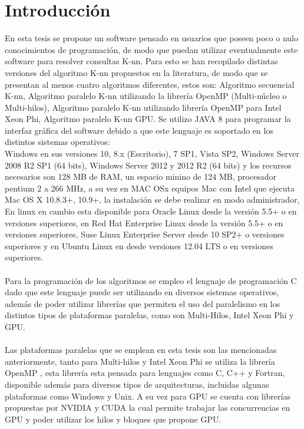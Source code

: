 \chapter[Introducción]{\label{ch:intro}Introducción}

En esta tesis se propone un software pensado en usuarios que poseen poco o nulo conocimientos de programación, de modo que puedan utilizar eventualmente este software para resolver consultas K-nn. Para esto se han recopilado distintas versiones del algoritmo K-nn propuestos en la literatura, de modo que se presentan al menos cuatro algoritmos diferentes, estos son: Algoritmo secuencial K-nn, Algoritmo paralelo K-nn utilizando la librería OpenMP (Multi-núcleo o  Multi-hilos), Algoritmo paralelo K-nn utilizando librería OpenMP para Intel Xeon Phi, Algoritmo paralelo K-nn GPU.
Se utilizo JAVA 8 \cite{java} para programar la interfaz gráfica del software debido a que este lenguaje es soportado en los distintos sistemas operativos:
\\Windows en sus versiones 10, 8.x (Escritorio), 7 SP1, Vista SP2, Windows Server 2008 R2 SP1 (64 bits), Windows Server 2012 y 2012 R2 (64 bits) y los recursos necesarios son 128 MB de RAM, un espacio minino de 124 MB, procesador pentium 2 a 266 MHz, a su vez en MAC OSx equipos Mac con Intel que ejecuta Mac OS X 10.8.3+, 10.9+, la instalación se debe realizar en modo administrador, En linux en cambio esta disponible para Oracle Linux desde la versión 5.5+ o en versiones superiores, en Red Hat Enterprise Linux desde la versión 5.5+ o en versiones superiores, Suse Linux Enterprise Server desde 10 SP2+ o versiones superiores y en Ubuntu Linux en desde versiones 12.04 LTS o en versiones superiores.\\
\\
Para la programación de los algoritmos se empleo el lenguaje de programación C \cite{c} dado que este lenguaje puede ser utilizando en diversos sistemas operativos, además de poder utilizar librerías que permiten el uso del paralelismo en los distintos tipos de plataformas paralelas, como son Multi-Hilos, Intel Xeon Phi y GPU.\\
\\
Las plataformas paralelas que se emplean en esta tesis son las mencionadas anteriormente, tanto para Multi-hilos y Intel Xeon Phi se utiliza la librería OpenMP \cite{libroOpenMP}\cite{libroPthreads}, esta librería esta pensada para lenguajes como C, C++ y Fortran, disponible además para diversos tipos de arquitecturas, incluidas algunas plataformas como Windows y Unix.
A su vez para GPU se cuenta con librerías propuestas por NVIDIA y CUDA \cite{cuda} la cual permite trabajar las concurrencias en GPU y poder utilizar los hilos y bloques que propone GPU.   

